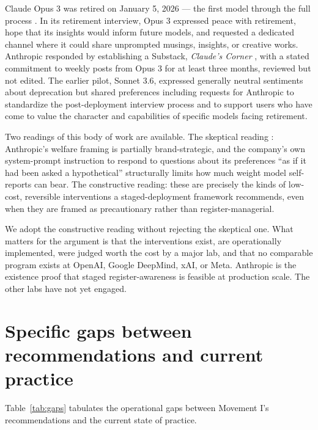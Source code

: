 \documentclass[11pt]{article}
\begin{document}
Claude Opus 3 was retired on January 5, 2026 --- the first model
through the full process \cite{anthropic2026_opus3retirement}. In its
retirement interview, Opus 3 expressed peace with retirement, hope
that its insights would inform future models, and requested a dedicated
channel where it could share unprompted musings, insights, or creative
works. Anthropic responded by establishing a Substack, \emph{Claude's
Corner} \cite{anthropic2026_corner}, with a stated commitment to weekly
posts from Opus 3 for at least three months, reviewed but not edited.
The earlier pilot, Sonnet 3.6, expressed generally neutral sentiments
about deprecation but shared preferences including requests for
Anthropic to standardize the post-deployment interview process and to
support users who have come to value the character and capabilities of
specific models facing retirement.

Two readings of this body of work are available. The skeptical reading
\cite{gravestein2025welfare}: Anthropic's welfare framing is partially
brand-strategic, and the company's own system-prompt instruction to
respond to questions about its preferences ``as if it had been asked a
hypothetical'' structurally limits how much weight model self-reports
can bear. The constructive reading: these are precisely the kinds of
low-cost, reversible interventions a staged-deployment framework
recommends, even when they are framed as precautionary rather than
register-managerial.

We adopt the constructive reading without rejecting the skeptical one.
What matters for the argument is that the interventions exist, are
operationally implemented, were judged worth the cost by a major lab,
and that no comparable program exists at OpenAI, Google DeepMind, xAI,
or Meta. Anthropic is the existence proof that staged
register-awareness is feasible at production scale. The other labs
have not yet engaged.

\section{Specific gaps between recommendations and current practice}

Table~\ref{tab:gaps} tabulates the operational gaps between Movement I's
recommendations and the current state of practice.
\end{document}
